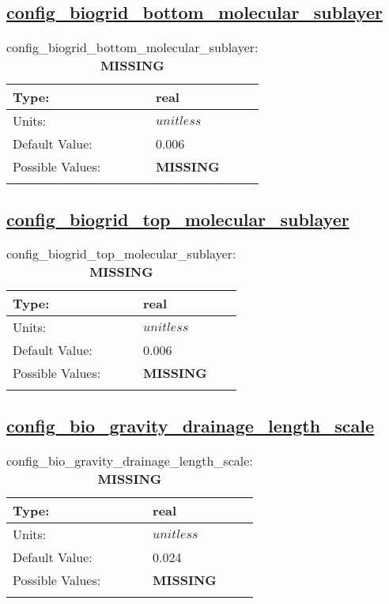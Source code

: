 \subsection[config\_biogrid\_bottom\_molecular\_sublayer]{\hyperref[sec:nm_tab_biogeochemistry]{config\_biogrid\_bottom\_molecular\_sublayer}}
\label{subsec:nm_sec_config_biogrid_bottom_molecular_sublayer}
\begin{center}
\begin{longtable}{| p{2.0in} || p{4.0in} |}
    \hline
    Type: & real \\
    \hline
    Units: & $unitless$ \\
    \hline
    Default Value: & 0.006 \\
    \hline
    Possible Values: & {\bf \color{red} MISSING} \\
    \hline
    \caption{config\_biogrid\_bottom\_molecular\_sublayer: {\bf \color{red} MISSING}}
\end{longtable}
\end{center}
\subsection[config\_biogrid\_top\_molecular\_sublayer]{\hyperref[sec:nm_tab_biogeochemistry]{config\_biogrid\_top\_molecular\_sublayer}}
\label{subsec:nm_sec_config_biogrid_top_molecular_sublayer}
\begin{center}
\begin{longtable}{| p{2.0in} || p{4.0in} |}
    \hline
    Type: & real \\
    \hline
    Units: & $unitless$ \\
    \hline
    Default Value: & 0.006 \\
    \hline
    Possible Values: & {\bf \color{red} MISSING} \\
    \hline
    \caption{config\_biogrid\_top\_molecular\_sublayer: {\bf \color{red} MISSING}}
\end{longtable}
\end{center}
\subsection[config\_bio\_gravity\_drainage\_length\_scale]{\hyperref[sec:nm_tab_biogeochemistry]{config\_bio\_gravity\_drainage\_length\_scale}}
\label{subsec:nm_sec_config_bio_gravity_drainage_length_scale}
\begin{center}
\begin{longtable}{| p{2.0in} || p{4.0in} |}
    \hline
    Type: & real \\
    \hline
    Units: & $unitless$ \\
    \hline
    Default Value: & 0.024 \\
    \hline
    Possible Values: & {\bf \color{red} MISSING} \\
    \hline
    \caption{config\_bio\_gravity\_drainage\_length\_scale: {\bf \color{red} MISSING}}
\end{longtable}
\end{center}
